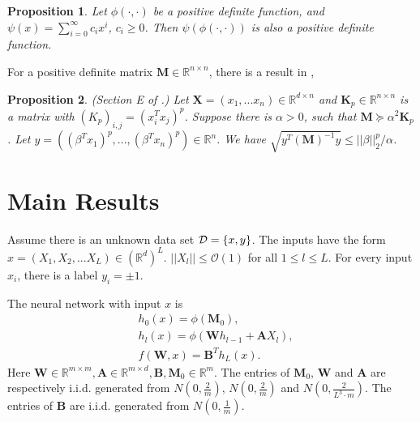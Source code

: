 \documentclass{article}
\newcommand{\cO}{\mathcal{O}}
\newtheorem{pro}{\textbf{Proposition}}[section]
\newcommand{\dataset}{{\cal D}}
\begin{document}
\begin{pro}\label{c2}
Let $\phi(\cdot, \cdot)$ be a positive definite function, and $\psi(x)=\sum_{i=0}^\infty c_ix^i$, $c_i\geq 0$. Then $\psi(\phi(\cdot,\cdot))$ is also a positive definite function.
\end{pro}

For a positive definite matrix $\bm{M}\in \mathbb{R}^{n\times n}$, there is a result in  \cite{sa},
\begin{pro}\label{claa}(Section E of \cite{sa}.)
Let $\bm {X}=(x_1,...x_n)\in \mathbb{R}^{d\times n}$ and $\bm{K}_{p}\in \mathbb{R}^{n\times n}$ is a matrix with $(K_{p})_{i,j}=(x_i^Tx_j)^{p}$. Suppose there is $\alpha>0$, such that $\bm{M}\succeq \alpha^2 \bm{K}_{p}$. Let $y=((\beta^Tx_1)^{p},...,(\beta^Tx_n)^{p})\in \mathbb{R}^{n}$. We have $\sqrt{y^T(\bm{M})^{-1}y}\leq ||\beta||_2^{p}/\alpha$.
\end{pro}

\section{Main Results}
Assume there is an unknown data set $\dataset=\{x,y\}$. The inputs have the form $x=(X_1,X_2,...X_L)\in (\mathbb{R}^d)^L$. $||X_l||\leq \cO(1)$ for all $1\leq l\leq L$.  For every input $x_i$, there is a label $y_i=\pm1$.

The neural network with input $x$ is
\begin{equation}\label{ini}
\begin{aligned}
&h_0(x)=\phi(\bm{M}_0),\\
&h_{l}(x)=\phi(\bm{W}h_{l-1}+\bm{A}X_l),\\
&f(\bm{W},x)=\bm{B}^Th_L(x).
\end{aligned}
\end{equation}
Here $ \bm{W}\in\mathbb{R}^{m\times m}, \bm{A}\in \mathbb{R}^{m\times d}, \bm{B}, \bm{M}_0 \in \mathbb{R}^{ m}$. The entries of $\bm{M}_0$, $\bm{W}$ and $\bm{A}$ are respectively i.i.d. generated from $N(0,\frac{2}{m})$, $N(0,\frac{2}{m})$ and $N(0,\frac{2}{L^3\cdot m})$. The entries of $\bm{B}$ are i.i.d. generated from $N(0,\frac{1}{m})$.
\end{document}
